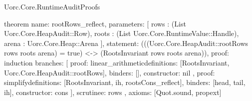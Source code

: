 \begin{lexlean}{Uorc.Core.RuntimeAuditProofs}
\begin{semanticmodule}
theorem{
  name: rootRows_reflect,
  parameters: [
    rows : (List Uorc.Core.HeapAudit::Row),
    roots : (List Uorc.Core.RuntimeValue::Handle),
    arena : Uorc.Core.Heap::Arena
  ],
  statement: (((Uorc.Core.HeapAudit::rootRows rows roots arena) = true) <-> (RootsInvariant rows roots arena)),
  proof: induction{
    branches: [
      {
        proof: linear_arithmetic{definitions: [RootsInvariant, Uorc.Core.HeapAudit::rootRows]},
        binders: [],
        constructor: nil
      },
      {
        proof: simplify{definitions: [RootsInvariant, ih, rootsCons_reflect]},
        binders: [head, tail, ih],
        constructor: cons
      }
    ],
    scrutinee: rows
  },
  axioms: [Quot.sound, propext]
}
\end{semanticmodule}
\end{lexlean}
